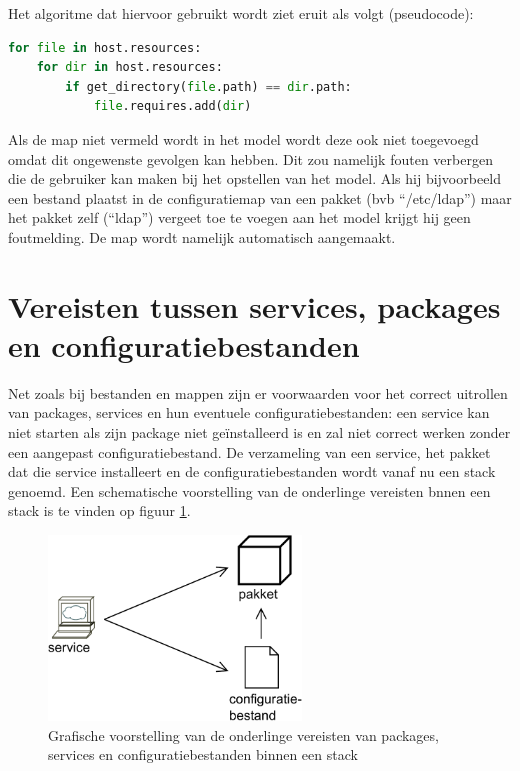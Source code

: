 Het algoritme dat hiervoor gebruikt wordt ziet eruit als volgt (pseudocode):
\begin{minipage}{\textwidth}
\begin{lstlisting}[language=Python]
for file in host.resources:
    for dir in host.resources:
        if get_directory(file.path) == dir.path:
            file.requires.add(dir)
\end{lstlisting}
\end{minipage}

Als de map niet vermeld wordt in het model wordt deze ook niet toegevoegd omdat dit ongewenste gevolgen kan hebben.
Dit zou namelijk fouten verbergen die de gebruiker kan maken bij het opstellen van het model.
Als hij bijvoorbeeld een bestand plaatst in de configuratiemap van een pakket (bvb ``/etc/ldap'') maar het pakket zelf (``ldap'') vergeet toe te voegen aan het model krijgt hij geen foutmelding.
De map wordt namelijk automatisch aangemaakt.


\section{Vereisten tussen services, packages en configuratiebestanden}
\label{sec:stacks}
Net zoals bij bestanden en mappen zijn er voorwaarden voor het correct uitrollen van packages, services en hun eventuele configuratiebestanden:
een service kan niet starten als zijn package niet ge\"installeerd is en zal niet correct werken zonder een aangepast configuratiebestand.
De verzameling van een service, het pakket dat die service installeert en de configuratiebestanden wordt vanaf nu een stack genoemd.
Een schematische voorstelling van de onderlinge vereisten bnnen een stack is te vinden op figuur \ref{fig:stack}.

\begin{figure}[h]
    \begin{center}
    \includegraphics[width=0.6\textwidth]{images/stack.pdf}
    \caption{Grafische voorstelling van de onderlinge vereisten van packages, services en configuratiebestanden binnen een stack}
    \label{fig:stack}
    \end{center}
\end{figure}

